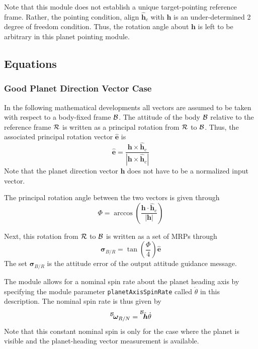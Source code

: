 Note that this module does not establish a unique target-pointing reference frame.  Rather, the pointing condition, align $\hat{\bm h}_{c}$ with $\bm h$ is an under-determined 2 degree of freedom condition.  Thus, the rotation angle about $\bm h$ is left to be arbitrary in this planet pointing module. 

\subsection{Equations}
\subsubsection{Good Planet Direction Vector Case}\label{sec:withHeading}
In the following mathematical developments all vectors are assumed to be taken with respect to a body-fixed frame $\cal B$.  The attitude of the body $\cal B$ relative to the reference frame $\cal R$ is written as a principal rotation from $\cal R$ to $\cal B$.  Thus, the associated principal rotation vector $\hat{\bm e}$ is
\begin{equation}
	\label{eq:ssp:1}
	\hat{\bm e} = \frac{\bm h \times \hat{\bm h}_{c}}{|\bm h \times \hat{\bm h}_{c}|}
\end{equation}
Note that the planet direction vector $\bm h$ does not have to be a normalized input vector.  

The principal rotation angle between the two vectors is given through
\begin{equation}
	\label{eq:ssp:2}
	\Phi = \arccos \left( \frac{\bm h  \cdot \hat{\bm h}_{c} }{|\bm h|} \right)
\end{equation}

Next, this rotation from $\cal R$ to $\cal B$ is written as a set of MRPs through
\begin{equation}
	\label{eq:ssp:3}
	\bm\sigma_{B/R} = \tan\left(\frac{\Phi}{4}\right) \hat{\bm e}
\end{equation}
The set $\bm\sigma_{B/R}$ is the attitude error of the output attitude guidance message.  

The module allows for a nominal spin rate about the planet heading axis by specifying the module parameter {\tt planetAxisSpinRate} called $\dot \theta$ in this description.  The nominal spin rate is thus given by
\begin{equation}
	\leftexp{B}{\bm\omega}_{R/N} = \leftexp{B}{\hat{\bm h}} \dot\theta
\end{equation}
Note that this constant nominal spin is only for the case where the planet is visible and the planet-heading vector measurement is available. 


